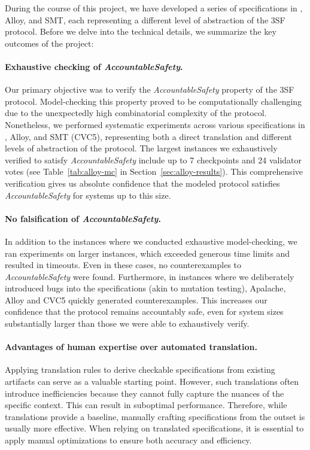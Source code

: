 
During the course of this project, we have developed a series of specifications
in \tlap{}, Alloy, and SMT, each representing a different level of abstraction
of the 3SF protocol. Before we delve into the technical details, we summarize
the key outcomes of the project:

\paragraph{Exhaustive checking of \textit{AccountableSafety}.} Our primary
objective was to verify the \textit{AccountableSafety} property of the 3SF
protocol. Model-checking this property proved to be computationally challenging
due to the unexpectedly high combinatorial complexity of the protocol.
Nonetheless, we performed systematic experiments across various specifications
in \tlap{}, Alloy, and SMT (CVC5), representing both a direct translation and
different levels of abstraction of the protocol. The largest instances we
exhaustively verified to satisfy \textit{AccountableSafety} include up to 7
checkpoints and 24 validator votes (see Table~\ref{tab:alloy-mc} in
Section~\ref{sec:alloy-results}). This comprehensive verification gives us
absolute confidence that the modeled protocol satisfies
\textit{AccountableSafety} for systems up to this size.

\paragraph{No falsification of \textit{AccountableSafety}.} In addition to the
instances where we conducted exhaustive model-checking, we ran experiments on
larger instances, which exceeded generous time limits and resulted in timeouts.
Even in these cases, no counterexamples to \textit{AccountableSafety} were
found. Furthermore, in instances where we deliberately introduced bugs into the
specifications (akin to mutation testing), Apalache, Alloy and CVC5 quickly
generated counterexamples. This increases our confidence that the protocol
remains accountably safe, even for system sizes substantially larger than
those we were able to exhaustively verify.

\paragraph{Advantages of human expertise over automated translation.} Applying
translation rules to derive checkable specifications from existing artifacts can
serve as a valuable starting point. However, such translations often introduce
inefficiencies because they cannot fully capture the nuances of the specific
context. This can result in suboptimal performance. Therefore, while
translations provide a baseline, manually crafting specifications from the
outset is usually more effective. When relying on translated specifications, it is
essential to apply manual optimizations to ensure both accuracy and efficiency.

